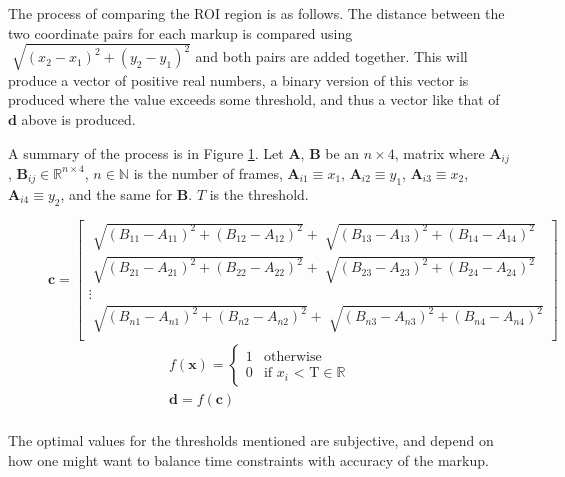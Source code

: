     The process of comparing the ROI region is as follows. The distance between the two coordinate pairs for each markup is compared using $\sqrt[]{{(x_2-x_1)}^2+{(y_2-y_1)}^2}$ and both pairs are added together. This will produce a vector of positive real numbers, a binary version of this vector is produced where the value exceeds some threshold, and thus a vector like that of $\pmb{d}$ above is produced.

    A summary of the process is in Figure \ref{fig:roiprocessing}. Let $\pmb{A}$, $\pmb{B}$ be an $n \times 4$, matrix where $\pmb{A}_{ij}$, $\pmb{B}_{ij} \in \mathbb{R}^{n \times 4}$, $n \in \mathbb{N}$ is the number of frames, ${\pmb{A}}_{i1} \equiv x_1$, ${\pmb{A}}_{i2} \equiv y_1$, ${\pmb{A}}_{i3} \equiv x_2$, ${\pmb{A}}_{i4} \equiv y_2$, and the same for $\pmb{B}$. $T$ is the threshold.

    \begin{figure}[h]
        \centering
        
        \[
        \pmb{c}=
        \begin{bmatrix}
            \sqrt[]{{(B_{11} - A_{11})}^2 + {(B_{12} - A_{12})}^2} + \sqrt[]{{(B_{13} - A_{13})}^2 + {(B_{14} - A_{14})}^2} \\
            \sqrt[]{{(B_{21} - A_{21})}^2 + {(B_{22} - A_{22})}^2} + \sqrt[]{{(B_{23} - A_{23})}^2 + {(B_{24} - A_{24})}^2} \\
            \vdots \\
            \sqrt[]{{(B_{n1} - A_{n1})}^2 + {(B_{n2} - A_{n2})}^2} + \sqrt[]{{(B_{n3} - A_{n3})}^2 + {(B_{n4} - A_{n4})}^2} \\
        \end{bmatrix}
        \]
        \begin{gather*}
            f(\pmb{x})=
        \begin{cases}
        1      & \text{otherwise}\\
        0      & \text{if $x_i$ < T} \in \mathbb{R} 
        \end{cases} \\
        \pmb{d} = f(\pmb{c}) \\
        \end{gather*}
        \caption{}
        \label{fig:roiprocessing}
    \end{figure} 

    The optimal values for the thresholds mentioned are subjective, and depend on how one might want to balance time constraints with accuracy of the markup.


